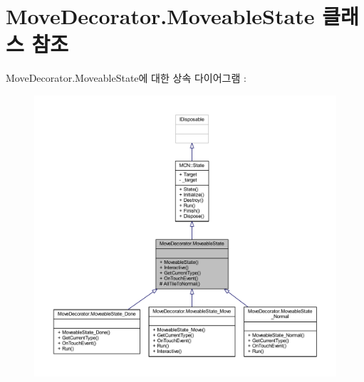 \hypertarget{class_move_decorator_1_1_moveable_state}{}\section{Move\+Decorator.\+Moveable\+State 클래스 참조}
\label{class_move_decorator_1_1_moveable_state}


Move\+Decorator.\+Moveable\+State에 대한 상속 다이어그램 \+: 
\nopagebreak
\begin{figure}[H]
\begin{center}
\leavevmode
\includegraphics[width=350pt]{class_move_decorator_1_1_moveable_state__inherit__graph}
\end{center}
\end{figure}


